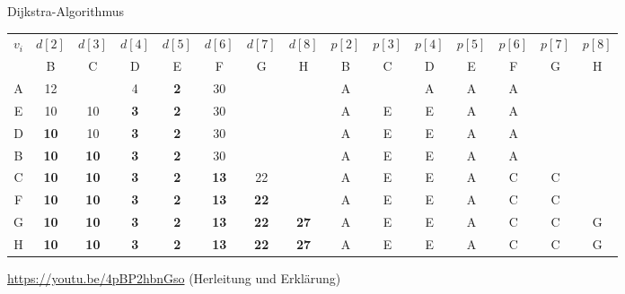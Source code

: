 \begin{example}{Dijkstra-Algorithmus}
\begin{center}
        \begin{tabular}{|c|ccccccc|ccccccc|}
            \hline
            \multirow{2}{*}{$v_i$} & $d[2]$      & $d[3]$      & $d[4]$     & $d[5]$     & $d[6]$      & $d[7]$      & $d[8]$      & $p[2]$ & $p[3]$ & $p[4]$ & $p[5]$ & $p[6]$ & $p[7]$ & $p[8]$ \\ \cline{2-15}
                                   & B           & C           & D          & E          & F           & G           & H           & B      & C      & D      & E      & F      & G      & H      \\
            \hline
            A                      & 12          &             & 4          & \textbf{2} & 30          &             &             & A      &        & A      & A      & A      &        &        \\
            E                      & 10          & 10          & \textbf{3} & \textbf{2} & 30          &             &             & A      & E      & E      & A      & A      &        &        \\
            D                      & \textbf{10} & 10          & \textbf{3} & \textbf{2} & 30          &             &             & A      & E      & E      & A      & A      &        &        \\
            B                      & \textbf{10} & \textbf{10} & \textbf{3} & \textbf{2} & 30          &             &             & A      & E      & E      & A      & A      &        &        \\
            C                      & \textbf{10} & \textbf{10} & \textbf{3} & \textbf{2} & \textbf{13} & 22          &             & A      & E      & E      & A      & C      & C      &        \\
            F                      & \textbf{10} & \textbf{10} & \textbf{3} & \textbf{2} & \textbf{13} & \textbf{22} &             & A      & E      & E      & A      & C      & C      &        \\
            G                      & \textbf{10} & \textbf{10} & \textbf{3} & \textbf{2} & \textbf{13} & \textbf{22} & \textbf{27} & A      & E      & E      & A      & C      & C      & G      \\
            H                      & \textbf{10} & \textbf{10} & \textbf{3} & \textbf{2} & \textbf{13} & \textbf{22} & \textbf{27} & A      & E      & E      & A      & C      & C      & G      \\
            \hline
        \end{tabular}
    \end{center}

    \vspace{1em}

    \url{https://youtu.be/4pBP2hbnGso} (Herleitung und Erklärung)
\end{example}

